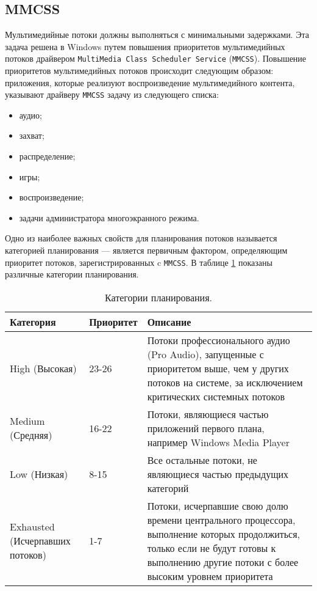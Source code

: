 \subsection{MMCSS}

Мультимедийные потоки должны выполняться с минимальными задержками. Эта задача
решена в Windows путем повышения приоритетов мультимедийных потоков драйвером
\texttt{MultiMedia Class Scheduler Service} (\texttt{MMCSS}). Повышение
приоритетов мультимедийных потоков происходит следующим образом: приложения,
которые реализуют воспроизведение мультимедийного контента, указывают драйверу
\texttt{MMCSS} задачу из следующего списка:

\begin{itemize}
    \item аудио;
    \item захват;
    \item распределение;
    \item игры;
    \item воспроизведение;
    \item задачи администратора многоэкранного режима.
\end{itemize}

Одно из наиболее важных свойств для планирования потоков называется категорией
планирования --- является первичным фактором, определяющим приоритет потоков,
зарегистрированных c \texttt{MMCSS}. В таблице \ref{tab:plan} показаны
различные категории планирования.

\begin{table}[h]
    \caption{Категории планирования.}
    \begin{center}
        \begin{tabular}{|p{40mm}|p{30mm}|p{80mm}|}
            \hline
            \textbf{Категория} & \textbf{Приоритет} & \textbf{Описание} \\
            \hline
            High (Высокая) & 23-26 & Потоки профессионального аудио (Pro
Audio), запущенные с приоритетом выше, чем у других потоков на системе, за
исключением критических системных потоков \\
            \hline
            Medium (Средняя) & 16-22 & Потоки, являющиеся частью приложений
первого плана, например Windows Media Player \\
            \hline
            Low (Низкая) & 8-15 & Все остальные потоки, не являющиеся частью
предыдущих категорий \\
            \hline
            Exhausted (Исчерпавших потоков) & 1-7 & Потоки, исчерпавшие свою
долю времени центрального процессора, выполнение которых продолжиться, только
если не будут готовы к выполнению другие потоки с более высоким уровнем
приоритета \\
            \hline
        \end{tabular}
    \end{center}
    \label{tab:plan}
\end{table}

